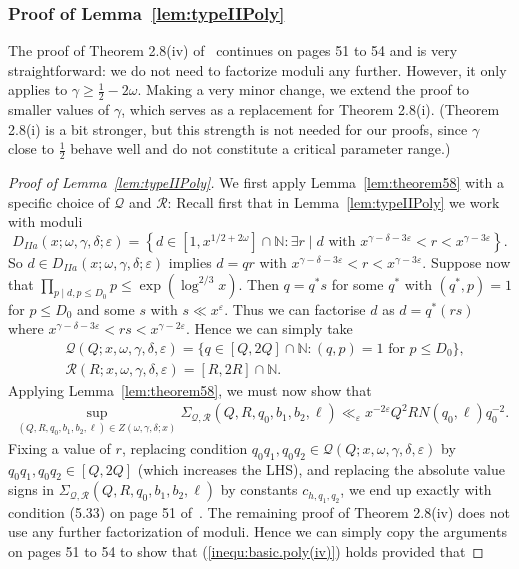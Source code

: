 \documentclass{amsart}
\numberwithin{equation}{section}
\begin{document}
\subsubsection{Proof of Lemma~\ref{lem:typeIIPoly}} The proof of Theorem 2.8(iv) of~\cite{Polymath:2014:EDZ} continues on pages 51 to 54 and is very straightforward: we do not need to factorize moduli any further.  However, it only applies to $\gamma \geq \frac{1}{2} -2\omega$. Making a very minor change, we extend the proof to smaller values of $\gamma$, which serves as a replacement for Theorem 2.8(i). (Theorem 2.8(i) is a bit stronger, but this strength is not needed for our proofs, since $\gamma$ close to $\frac{1}{2}$ behave well and do not constitute a critical parameter range.)

\begin{proof}[Proof of Lemma~\ref{lem:typeIIPoly}]
We first apply Lemma~\ref{lem:theorem58} with a specific choice of $\mathcal{Q}$ and $\mathcal{R}$: 
Recall first that in Lemma~\ref{lem:typeIIPoly} we work with moduli $$D_{IIa}(x;\omega,\gamma,\delta;\varepsilon) = \left\{d \in  [1, x^{1/2+2\omega}]\cap \mathbb{N}:  \exists r \mid d \mbox{ with } x^{\gamma-\delta -3\varepsilon} < r < x^{\gamma - 3\varepsilon} \right\}.$$
So $d \in D_{IIa}(x;\omega,\gamma,\delta;\varepsilon) $ implies $d=qr$  with $x^{\gamma-\delta -3\varepsilon} < r < x^{\gamma - 3\varepsilon}$. Suppose now that $\prod_{p \mid d, p \leq D_0} p \leq \exp(\log^{2/3} x)$. Then $q=q^* s$ for some $q^*$ with $(q^*,p)=1$ for $p \leq D_0$ and some $s$ with $s \ll x^{\varepsilon}$. Thus we can factorise $d$ as $d=q^* (rs)$ where $x^{\gamma-\delta -3\varepsilon} < rs < x^{\gamma - 2\varepsilon}$. 
Hence    we can simply take
\begin{align*}
&\mathcal{Q}(Q;x,\omega,\gamma,\delta,\varepsilon)=\{q\in [Q,2Q] \cap \mathbb{N}: (q,p)=1 \mbox{ for } p \leq D_0\},\\
&\mathcal{R}(R;x,\omega,\gamma,\delta,\varepsilon)=[R,2R] \cap \mathbb{N}.
\end{align*}
Applying Lemma~\ref{lem:theorem58}, we must now show that 
\begin{align}\label{inequ:basic.poly(iv)}
\sup_{(Q,R,q_0,b_1,b_2,\ell) \in Z(\omega,\gamma,\delta;x)}\Sigma_{\mathcal{Q},\mathcal{R}}(Q,R,q_0,b_1,b_2,\ell) \ll_\varepsilon x^{-2\varepsilon} Q^2RN (q_0, \ell) q_0^{-2}.
\end{align}
Fixing a value of $r$, replacing   condition  $q_0q_1, q_0 q_2 \in \mathcal{Q}(Q;x,\omega,\gamma,\delta,\varepsilon)$  by $q_0q_1, q_0 q_2 \in [Q,2Q]$ (which increases the LHS), and replacing the absolute value signs in $\Sigma_{\mathcal{Q},\mathcal{R}}(Q,R,q_0,b_1,b_2,\ell)$ by constants $c_{h,q_1,q_2}$, we end up exactly with condition (5.33) on page 51 of~\cite{Polymath:2014:EDZ}. The remaining proof of Theorem 2.8(iv) does not use any further factorization of moduli. Hence  we can simply copy the arguments on pages 51 to 54 to show that (\ref{inequ:basic.poly(iv)}) holds provided that

\end{proof}
\end{document}
